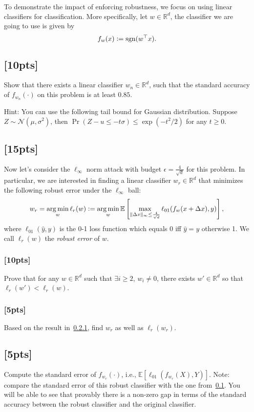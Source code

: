 \documentclass[letterpaper,11pt]{article}
\theoremstyle{definition}
\newcommand{\RR}{\mathbb{R}}
\newcommand{\EE}{\mathbb{E}}
\DeclareMathOperator*{\argmin}{arg\,min}
\newcommand{\defeq}{\vcentcolon=}
\begin{document}
To demonstrate the impact of enforcing robustness, we focus on using linear classifiers for classification. More specifically, let $w\in\RR^d$, the classifier we are going to use is given by 
\begin{equation*}
    f_w(x) \defeq \text{sgn}(w^\top x).
\end{equation*}

\subsection{[10pts]}
\label{p:1.1}
Show that there exists a linear classifier $w_n\in\RR^d$, such that the standard accuracy of $f_{w_n}(\cdot)$ on this problem is at least $0.85$. 

Hint: You can use the following tail bound for Gaussian distribution. Suppose $Z\sim \mathcal{N}(\mu, \sigma^2)$, then $\Pr(Z - u \leq -t\sigma) \leq \exp(-t^2/2)$ for any $t \geq 0$.

\subsection{[15pts]}
\label{p:1.2}
Now let's consider the $\ell_\infty$ norm attack with budget $\epsilon = \frac{4}{\sqrt{d}}$ for this problem. In particular, we are interested in finding a linear classifier $w_r\in\RR^d$ that minimizes the following robust error under the $\ell_\infty$ ball:
\begin{equation*}
    w_r = \argmin_w\ell_{r}(w) \defeq\argmin_w \EE\left[\max_{\|\Delta x\|_\infty \leq \frac{4}{\sqrt{d}}}\ell_{01}(f_{w}(x + \Delta x), y)\right],
\end{equation*}
where $\ell_{01}(\hat{y}, y)$ is the 0-1 loss function which equals 0 iff $\hat{y} = y$ otherwise 1. We call $\ell_r(w)$ the \emph{robust error} of $w$.

\subsubsection{[10pts]}
\label{p:1.2.1}
Prove that for any $w\in\RR^d$ such that $\exists i \geq 2$, $w_i \neq 0$, there exists $w'\in\RR^d$ so that $\ell_r(w') < \ell_r(w)$.

\subsubsection{[5pts]}
\label{p:1.2.2}
Based on the result in~\ref{p:1.2.1}, find $w_r$ as well as $\ell_r(w_r)$.

\subsection{[5pts]}
Compute the standard error of $f_{w_r}(\cdot)$, i.e., $\EE[\ell_{01}(f_{w_r}(X), Y)]$. Note: compare the standard error of this robust classifier with the one from~\ref{p:1.1}. You will be able to see that provably there is a non-zero gap in terms of the standard accuracy between the robust classifier and the original classifier.
\end{document}
